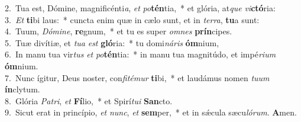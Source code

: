 {2.~}Tua est, Dómine, magnificénti\textit{a}, \textit{et} \textit{po}\textbf{tén}tia,~* et glória, at\textit{que} \textit{vi}\textbf{ctó}ria:\\
{3.~}\textit{Et} \textbf{ti}bi laus:~* cuncta enim quæ in cælo sunt, et in \textit{ter}\textit{ra}, \textbf{tu}a sunt:\\
{4.~}Tuum, \textit{Dó}\textit{mi}\textit{ne}, \textbf{re}gnum,~* et tu es super \textit{om}\textit{nes} \textbf{prín}cipes.\\
{5.~}Tuæ divítiæ, et \textit{tu}\textit{a} \textit{est} \textbf{gló}ria:~* tu domi\textit{ná}\textit{ris} \textbf{óm}nium,\\
{6.~}In manu tua vir\textit{tus} \textit{et} \textit{po}\textbf{tén}tia:~* in manu tua magnitúdo, et impé\textit{ri}\textit{um} \textbf{óm}nium.\\
{7.~}Nunc ígitur, Deus noster, con\textit{fi}\textit{té}\textit{mur} \textbf{ti}bi,~* et laudámus nomen \textit{tu}\textit{um} \textbf{ín}clytum.\\
{8.~}Glória \textit{Pa}\textit{tri}, \textit{et} \textbf{Fí}lio,~* et Spirí\textit{tu}\textit{i} \textbf{San}cto.\\
{9.~}Sicut erat in princípio, \textit{et} \textit{nunc}, \textit{et} \textbf{sem}per,~* et in sǽcula sæcu\textit{ló}\textit{rum}. \textbf{A}men.\\
